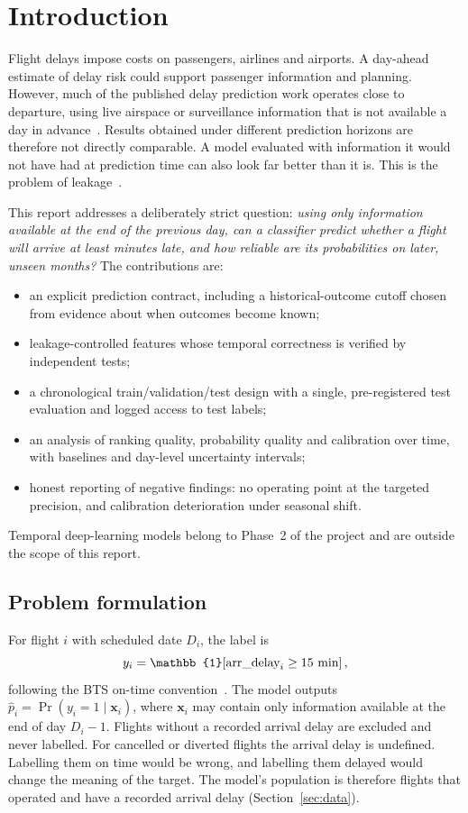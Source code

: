 \documentclass[conference]{IEEEtran}
\begin{document}
\section{Introduction}\label{sec:intro}
Flight delays impose costs on passengers, airlines and airports. A day-ahead estimate of delay
risk could support passenger information and planning. However, much of the published delay
prediction work operates close to departure, using live airspace or surveillance information that
is not available a day in advance~\cite{rebollo2014,gui2020}. Results obtained under different
prediction horizons are therefore not directly comparable. A model evaluated with information it
would not have had at prediction time can also look far better than it is. This is the problem of
leakage~\cite{kaufman2012}.

This report addresses a deliberately strict question: \emph{using only information available at
the end of the previous day, can a classifier predict whether a flight will arrive at least
\TargetMinutes{} minutes late, and how reliable are its probabilities on later, unseen months?}
The contributions are:
\begin{itemize}
\item an explicit prediction contract, including a historical-outcome cutoff chosen from evidence
about when outcomes become known;
\item leakage-controlled features whose temporal correctness is verified by independent tests;
\item a chronological train/validation/test design with a single, pre-registered test evaluation
and logged access to test labels;
\item an analysis of ranking quality, probability quality and calibration over time, with
baselines and day-level uncertainty intervals;
\item honest reporting of negative findings: no operating point at the targeted precision, and
calibration deterioration under seasonal shift.
\end{itemize}
Temporal deep-learning models belong to Phase~2 of the project and are outside the scope of this
report.

\subsection{Problem formulation}
For flight $i$ with scheduled date $D_i$, the label is
\begin{equation}
y_i = \mathbb{1}\!\left[\text{arr\_delay}_i \geq \TargetMinutes\ \text{min}\right],
\end{equation}
following the BTS on-time convention~\cite{bts_ontime}. The model outputs
$\hat{p}_i = \Pr(y_i = 1 \mid \mathbf{x}_i)$, where $\mathbf{x}_i$ may contain only information
available at the end of day $D_i - 1$. Flights without a recorded arrival delay are excluded and
never labelled. For cancelled or diverted flights the arrival delay is undefined. Labelling them
on time would be wrong, and labelling them delayed would change the meaning of the target. The
model's population is therefore flights that operated and have a recorded arrival delay
(Section~\ref{sec:data}).
\end{document}
